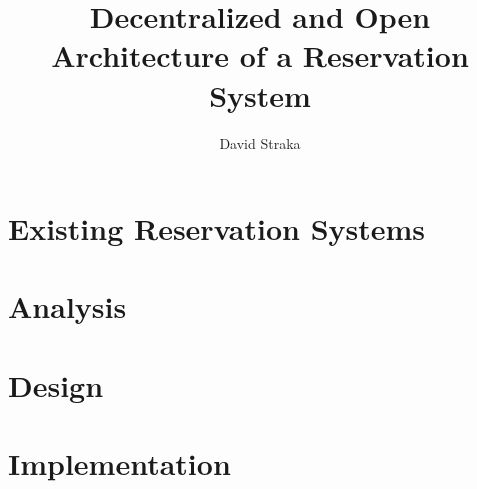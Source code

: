 \documentclass[thesis=M,english]{template/FITthesis}[2019/12/23]
\title{Decentralized and Open Architecture of a Reservation System}
\author{David Straka} %
\begin{document}



\begin{introduction}
	\label{part:introduction}
	
\end{introduction}


\chapter{Existing Reservation Systems}
\label{part:existing_reservation_systems}




\chapter{Analysis}
\label{part:analysis}




\chapter{Design}
\label{part:design}




\chapter{Implementation}
\label{part:implementation}
\end{document}
